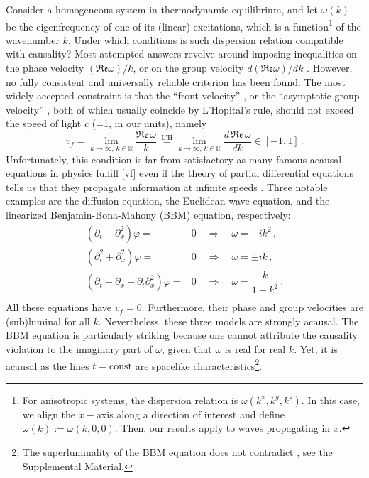 \documentclass[prl, amsfonts, amssymb, amsmath, nofootinbib,reprint, showkeys, twoside,notitlepage]{revtex4-2}
\theoremstyle{definition}
\theoremstyle{theorem}
\theoremstyle{corollary}
\begin{document}
Consider a homogeneous system in thermodynamic equilibrium, and let $\omega(k)$ be the eigenfrequency of one of its (linear) excitations, which is a function\footnote{%
For anisotropic systems, the dispersion relation is $\omega(k^x,k^y,k^z)$. In this case, we align the $x-$axis along a direction of interest and define $\omega(k):=\omega(k,0,0)$. Then, our results apply to waves propagating in $x$.} of the wavenumber $k$.
Under which conditions is such dispersion relation compatible with causality? 
Most attempted answers revolve around imposing inequalities on the phase velocity $(\mathfrak{Re}\omega)/k$, or on the group velocity $d(\mathfrak{Re}\omega)/dk$ \cite{Brillouin_book,DenicolKodamaMota2008,Koide2011}. However, no fully consistent and universally reliable criterion has been found. The most widely accepted constraint is that the ``front velocity'' \cite{FoxKuper1970,Krotscheck1978}, or the ``asymptotic group velocity'' \cite{Pu2010}, both of which usually coincide by L'Hopital's rule, should not exceed the speed of light $c$ (=1, in our units), namely
\begin{equation}\label{vf}
v_f =\lim_{k \rightarrow \infty, \, k \in \mathbb{R}} \dfrac{\mathfrak{Re} \,\omega}{k} \, \stackrel{\text{L'H}}{=} \! \lim_{k \rightarrow \infty, \, k \in \mathbb{R}} \dfrac{d \, \mathfrak{Re} \,\omega}{dk} \in [-1,1] \, .
\end{equation}
Unfortunately, this condition is far from satisfactory as many famous acausal equations in physics fulfill \eqref{vf} even if the theory of partial differential equations tells us that they propagate information at infinite speeds \cite{CourantHilbert2_book,Rauch_book}. Three notable examples are the diffusion equation, the Euclidean wave equation, and the linearized Benjamin-Bona-Mahony (BBM) \cite{Benjamin1972} equation, respectively:
\begin{equation}\label{exeption}
\begin{split}
(\partial_t - \partial^2_x) \varphi={}& 0 \quad \Longrightarrow \quad  \omega=-ik^2 \, , \\
(\partial_t^2+\partial^2_x) \varphi={}& 0 \quad  \Longrightarrow \quad \omega= \pm i k \, , \\
(\partial_t+\partial_x -\partial_t \partial^2_x)\varphi={}& 0 \quad \Longrightarrow \quad \omega = \dfrac{k}{1+k^2} \, . \\
\end{split}
\end{equation}
All these equations have $v_f=0$. Furthermore, their phase and group velocities are (sub)luminal for all $k$. Nevertheless, these three models are strongly acausal. The BBM equation is particularly striking because one cannot attribute the causality violation to the imaginary part of $\omega$, given that $\omega$ is real for real $k$. Yet, it is acausal as the lines $t=\text{const}$ are spacelike characteristics\footnote{The superluminality of the BBM equation does not contradict \cite{Krotscheck1978}, see the Supplemental Material.}. 
\end{document}
